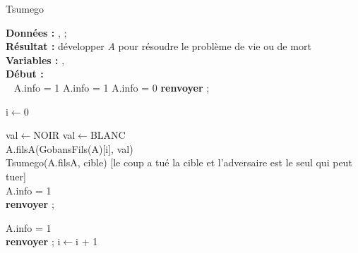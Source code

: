             \begin{algorithme}
                \caption{Tsumego}
                \textbf{Données :}
                ,
                ;\\
                \textbf{Résultat :} développer \textit{A} pour résoudre le problème de vie ou de mort\\
                \textbf{Variables :}
                ,\\
                \textbf{Début :}\\
                \
                {
                    {
                        A.info = 1
                    }{
                        {
                            A.info = 1
                        }{
                            A.info = 0
                        }
                    }
                    \textbf{renvoyer} ;
                }
                
                i$\leftarrow$0\\
                {
                    {
                        val$\leftarrow$NOIR
                    }{
                        val$\leftarrow$BLANC
                    }
                    \\
                    A.filsA(GobansFils(A)[i], val)\\
                    {
                        Tsumego(A.filsA, cible)
                    }{
                        [le coup a tué la cible et l'adversaire est le seul qui peut tuer]\\
                        A.info = 1\\
                        \textbf{renvoyer} ;
                    }
                    
                    {
                        A.info = 1\\
                        \textbf{renvoyer} ;
                    }
                    i$\leftarrow$i + 1
                }
            \end{algorithme}
            
    
    
    